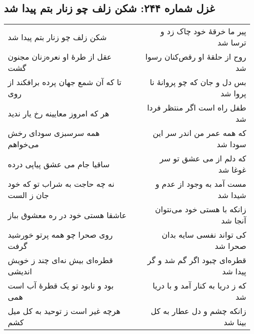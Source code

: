\begin{center}
\section*{غزل شماره ۲۴۴: شکن زلف چو زنار بتم پیدا شد}
\label{sec:244}
\begin{longtable}{l p{0.5cm} r}
شکن زلف چو زنار بتم پیدا شد
&&
پیر ما خرقهٔ خود چاک زد و ترسا شد
\\
عقل از طرهٔ او نعره‌زنان مجنون گشت
&&
روح از حلقهٔ او رقص‌کنان رسوا شد
\\
تا که آن شمع جهان پرده برافکند از روی
&&
بس دل و جان که چو پروانهٔ نا پروا شد
\\
هر که امروز معایینه رخ یار ندید
&&
طفل راه است اگر منتظر فردا شد
\\
همه سرسبزی سودای رخش می‌خواهم
&&
که همه عمر من اندر سر این سودا شد
\\
ساقیا جام می عشق پیاپی درده
&&
که دلم از می عشق تو سر غوغا شد
\\
نه چه حاجت به شراب تو که خود جان ز الست
&&
مست آمد به وجود از عدم و شیدا شد
\\
عاشقا هستی خود در ره معشوق بباز
&&
زانکه با هستی خود می‌نتوان آنجا شد
\\
روی صحرا چو همه پرتو خورشید گرفت
&&
کی تواند نفسی سایه بدان صحرا شد
\\
قطره‌ای بیش نه‌ای چند ز خویش اندیشی
&&
قطره‌ای چبود اگر گم شد و گر پیدا شد
\\
بود و نابود تو یک قطرهٔ آب است همی
&&
که ز دریا به کنار آمد و با دریا شد
\\
هرچه غیر است ز توحید به کل میل کشم
&&
زانکه چشم و دل عطار به کل بینا شد
\\
\end{longtable}
\end{center}
